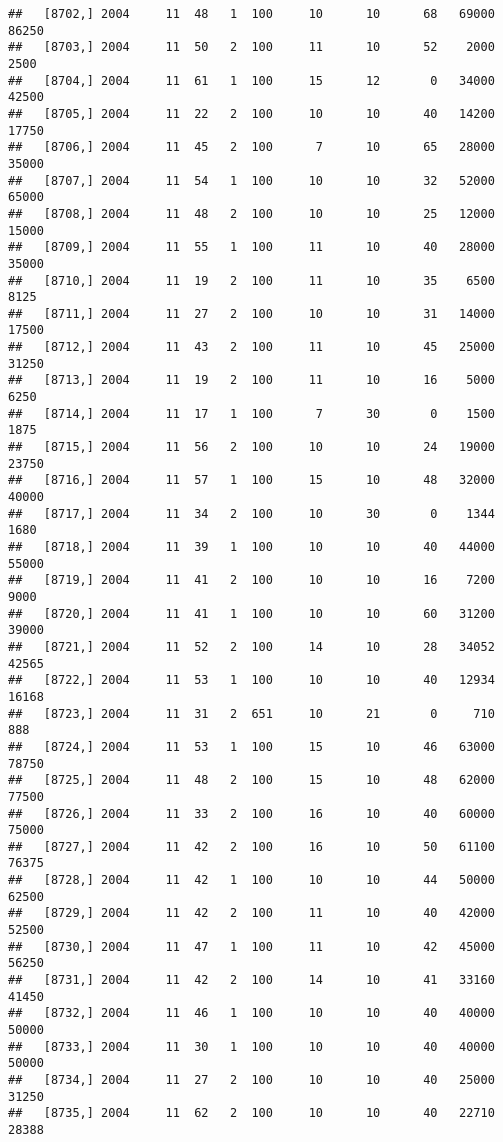 \documentclass{article}\usepackage[]{graphicx}\usepackage[]{color}
\makeatletter
\newenvironment{kframe}{%
 \def\at@end@of@kframe{}%
 \ifinner\ifhmode%
  \def\at@end@of@kframe{\end{minipage}}%
  \begin{minipage}{\columnwidth}%
 \fi\fi%
 \def\FrameCommand##1{\hskip\@totalleftmargin \hskip-\fboxsep
 \colorbox{shadecolor}{##1}\hskip-\fboxsep
     \hskip-\linewidth \hskip-\@totalleftmargin \hskip\columnwidth}%
 \MakeFramed {\advance\hsize-\width
   \@totalleftmargin\z@ \linewidth\hsize
   \@setminipage}}%
 {\par\unskip\endMakeFramed%
 \at@end@of@kframe}
\newenvironment{knitrout}{}{} %
\makeatother
\begin{document}
\begin{knitrout}
\begin{kframe}
\begin{verbatim}
##   [8702,] 2004     11  48   1  100     10      10      68   69000   86250
##   [8703,] 2004     11  50   2  100     11      10      52    2000    2500
##   [8704,] 2004     11  61   1  100     15      12       0   34000   42500
##   [8705,] 2004     11  22   2  100     10      10      40   14200   17750
##   [8706,] 2004     11  45   2  100      7      10      65   28000   35000
##   [8707,] 2004     11  54   1  100     10      10      32   52000   65000
##   [8708,] 2004     11  48   2  100     10      10      25   12000   15000
##   [8709,] 2004     11  55   1  100     11      10      40   28000   35000
##   [8710,] 2004     11  19   2  100     11      10      35    6500    8125
##   [8711,] 2004     11  27   2  100     10      10      31   14000   17500
##   [8712,] 2004     11  43   2  100     11      10      45   25000   31250
##   [8713,] 2004     11  19   2  100     11      10      16    5000    6250
##   [8714,] 2004     11  17   1  100      7      30       0    1500    1875
##   [8715,] 2004     11  56   2  100     10      10      24   19000   23750
##   [8716,] 2004     11  57   1  100     15      10      48   32000   40000
##   [8717,] 2004     11  34   2  100     10      30       0    1344    1680
##   [8718,] 2004     11  39   1  100     10      10      40   44000   55000
##   [8719,] 2004     11  41   2  100     10      10      16    7200    9000
##   [8720,] 2004     11  41   1  100     10      10      60   31200   39000
##   [8721,] 2004     11  52   2  100     14      10      28   34052   42565
##   [8722,] 2004     11  53   1  100     10      10      40   12934   16168
##   [8723,] 2004     11  31   2  651     10      21       0     710     888
##   [8724,] 2004     11  53   1  100     15      10      46   63000   78750
##   [8725,] 2004     11  48   2  100     15      10      48   62000   77500
##   [8726,] 2004     11  33   2  100     16      10      40   60000   75000
##   [8727,] 2004     11  42   2  100     16      10      50   61100   76375
##   [8728,] 2004     11  42   1  100     10      10      44   50000   62500
##   [8729,] 2004     11  42   2  100     11      10      40   42000   52500
##   [8730,] 2004     11  47   1  100     11      10      42   45000   56250
##   [8731,] 2004     11  42   2  100     14      10      41   33160   41450
##   [8732,] 2004     11  46   1  100     10      10      40   40000   50000
##   [8733,] 2004     11  30   1  100     10      10      40   40000   50000
##   [8734,] 2004     11  27   2  100     10      10      40   25000   31250
##   [8735,] 2004     11  62   2  100     10      10      40   22710   28388

\end{verbatim}
\end{kframe}
\end{knitrout}
\end{document}
